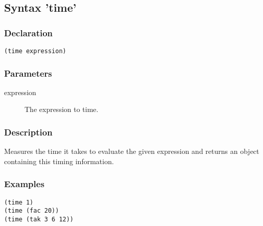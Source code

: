 \subsection{Syntax 'time'}
\label{builtins/time}

\subsubsection*{Declaration}
\begin{lstlisting}
(time expression)
\end{lstlisting}

\subsubsection*{Parameters}
\begin{description}
	\item[expression] The expression to time.
\end{description}

\subsubsection*{Description}
Measures the time it takes to evaluate the given expression and returns an object containing this timing information.

\subsubsection*{Examples}
\begin{lstlisting}
(time 1)
(time (fac 20))
(time (tak 3 6 12))
\end{lstlisting}
